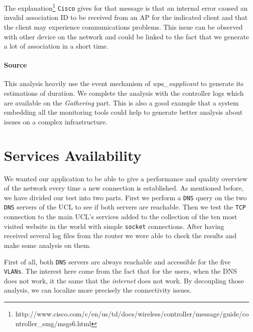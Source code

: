 The explanation\footnote{http://www.cisco.com/c/en/us/td/docs/wireless/controller/message/guide/controller\_smg/msgs6.html} \texttt{Cisco} gives for that message is that an internal error caused an invalid association ID to be received from an AP for the indicated client and that the client may experience communications problems. This issue can be observed with other device on the network and could be linked to the fact that we generate a lot of association in a short time.

\paragraph*{Source} This analysis heavily use the event mechanism of \emph{wpa_supplicant} to generate its estimations of duration. We complete the analysis with the controller logs which are available on the \emph{Gathering} part. This is also a good example that a system embedding all the monitoring tools could help to generate better analysis about issues on a complex infrastructure.


\section{Services Availability}
We wanted our application to be able to give a performance and quality overview of the network every time a new connection is established. As mentioned before, we have divided our test into two parts. First we perform a \texttt{DNS} query on the two \texttt{DNS} servers of the UCL to see if both servers are reachable. Then we test the \texttt{TCP} connection to the main UCL's services added to the collection of the ten most visited website in the world with simple \texttt{socket} connections. After having received several log files from the router we were able to check the results and make some analysis on them. 

 First of all, both \texttt{DNS} servers are always reachable and accessible for the five \texttt{VLANs}. The interest here come from the fact that for the users, when the DNS does not work, it the same that the \emph{internet} does not work. By decoupling those analysis, we can localize more precisely the connectivity issues.

